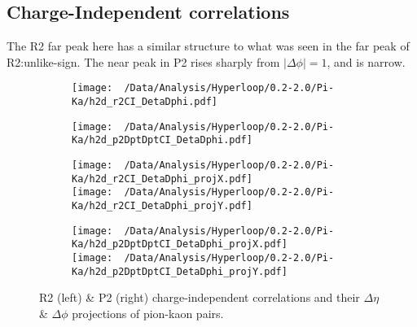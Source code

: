 \documentclass[12pt,a4paper,twoside]{report}
\begin{document}
\subsection{Charge-Independent correlations}
The R2 far peak here has a similar structure to what was seen in the far peak of R2:unlike-sign. The near peak in P2 rises sharply from $|\Delta\phi|=1$, and is narrow.
\begin{figure}[H]
	\begin{subfigure}{0.49\linewidth}
		\texttt{[image: ~/Data/Analysis/Hyperloop/0.2-2.0/Pi-Ka/h2d\_r2CI\_DetaDphi.pdf]}\\
	\end{subfigure}
	\begin{subfigure}{0.49\linewidth}
		\texttt{[image: ~/Data/Analysis/Hyperloop/0.2-2.0/Pi-Ka/h2d\_p2DptDptCI\_DetaDphi.pdf]}\\
	\end{subfigure}
\end{figure}
\begin{figure}[H]
	\ContinuedFloat
	\begin{subfigure}{0.49\linewidth}
		\texttt{[image: ~/Data/Analysis/Hyperloop/0.2-2.0/Pi-Ka/h2d\_r2CI\_DetaDphi\_projX.pdf]}\\
		\texttt{[image: ~/Data/Analysis/Hyperloop/0.2-2.0/Pi-Ka/h2d\_r2CI\_DetaDphi\_projY.pdf]}\\
	\end{subfigure}
	\begin{subfigure}{0.49\linewidth}
		\texttt{[image: ~/Data/Analysis/Hyperloop/0.2-2.0/Pi-Ka/h2d\_p2DptDptCI\_DetaDphi\_projX.pdf]}\\
		\texttt{[image: ~/Data/Analysis/Hyperloop/0.2-2.0/Pi-Ka/h2d\_p2DptDptCI\_DetaDphi\_projY.pdf]}\\
	\end{subfigure}
	\caption{R2 (left) \& P2 (right) charge-independent correlations and their $\Delta\eta$ \& $\Delta\phi$ projections of pion-kaon pairs.}
\end{figure}
\end{document}
